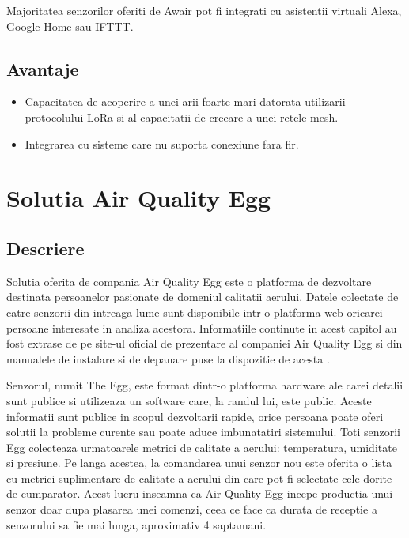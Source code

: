 Majoritatea senzorilor oferiti de Awair pot fi integrati cu asistentii virtuali Alexa, Google Home sau IFTTT.

\subsection{Avantaje}\label{subsec:awair_avantaje}
\begin{itemize}
	\item Capacitatea de acoperire a unei arii foarte mari datorata utilizarii protocolului LoRa si al capacitatii de creeare a unei retele mesh.
	\item Integrarea cu sisteme care nu suporta conexiune fara fir.
\end{itemize}

\section{Solutia Air Quality Egg}\label{sec:airqualityegg}
\subsection{Descriere}\label{subsec:airqualityegg_descriere}
Solutia oferita de compania Air Quality Egg este o platforma de dezvoltare destinata persoanelor pasionate de domeniul calitatii aerului. Datele colectate de catre 
senzorii din intreaga lume sunt disponibile intr-o platforma web oricarei persoane interesate in analiza acestora. Informatiile continute in acest capitol au fost 
extrase de pe site-ul oficial de prezentare al companiei Air Quality Egg si din manualele de instalare si de depanare puse la dispozitie de acesta \cite{airqualityegg}.

Senzorul, numit The Egg, este format dintr-o platforma hardware ale carei detalii sunt publice si utilizeaza un software care, la randul lui, este public. Aceste 
informatii sunt publice in scopul dezvoltarii rapide, orice persoana poate oferi solutii la probleme curente sau poate aduce imbunatatiri sistemului. Toti senzorii 
Egg colecteaza urmatoarele metrici de calitate a aerului: temperatura, umiditate si presiune. Pe langa acestea, la comandarea unui senzor nou este oferita o 
lista cu metrici suplimentare de calitate a aerului din care pot fi selectate cele dorite de cumparator. Acest lucru inseamna ca Air Quality Egg incepe productia 
unui senzor doar dupa plasarea unei comenzi, ceea ce face ca durata de receptie a senzorului sa fie mai lunga, aproximativ 4 saptamani.

